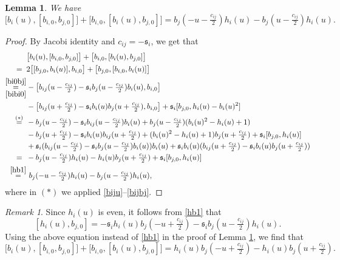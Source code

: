 \documentclass[11pt,reqno]{amsart}
\numberwithin{equation}{section}
\newtheorem{lem}[thm]{Lemma}
\theoremstyle{definition}
\theoremstyle{remark}
\newtheorem{rem}[thm]{Remark}
\newcommand{\beq}{\begin{equation}}
\newcommand{\eeq}{\end{equation}}
\newcommand{\ka}{{\mathfrak s}}
\begin{document}
\begin{lem}\label{serre0u0}
We have 
\begin{equation}\label{serre0u}
\big[ b_i(u),[ b_{i,0}, b_{j,0}]\big]+\big[ b_{i,0},[ b_{i}(u), b_{j,0}]\big]= b_j(-u-\tfrac{c_{ij}}{2}) h_i(u)-  b_j(u-\tfrac{c_{ij}}{2}) h_i(u).
\end{equation}
\end{lem}
\begin{proof} 
By Jacobi identity and $c_{ij}=-\ka_i$, we get that
\begin{align*}
&\big[ b_{i}(u),[ b_{i,0}, b_{j,0}]\big]+\big[ b_{i,0},[ b_{i}(u), b_{j,0}]\big]\\
=\hskip0.19cm &2\big[[ b_{j,0}, b_{i}(u)], b_{i,0}\big]+\big[ b_{j,0},[ b_{i,0}, b_i(u)]\big]\\
\overset{\eqref{bi0bj}}{\underset{\eqref{bibi0}}{=}} &-\big[ b_{ij}(u-\tfrac{c_{ij}}{2})-\ka_ib_j(u-\tfrac{c_{ij}}{2}) b_i(u), b_{i,0}\big]\\&-\big[ b_{ij}(u+\tfrac{c_{ij}}{2})-\ka_i b_i(u) b_j(u+\tfrac{c_{ij}}{2}), b_{i,0}\big]+\ka_i[ b_{j,0}, h_i(u)- b_i(u)^2]\\
\stackrel{(*)}{=}\hskip0.15cm &- b_j(u-\tfrac{c_{ij}}{2})- \ka_ib_{ij}(u-\tfrac{c_{ij}}{2}) b_i(u)+ b_j(u-\tfrac{c_{ij}}{2})( b_i(u)^2- h_i(u)+1)\\& - b_j(u+\tfrac{c_{ij}}{2})- \ka_ib_i(u) b_{ij}(u+\tfrac{c_{ij}}{2})+ ( b_i(u)^2- h_i(u)+1) b_j(u+\tfrac{c_{ij}}{2})+\ka_i[ b_{j,0}, h_i(u)]\\&+\ka_i( b_{ij}(u-\tfrac{c_{ij}}{2})-\ka_i b_j(u-\tfrac{c_{ij}}{2}) b_i(u)) b_i(u)+ \ka_ib_i(u)( b_{ij}(u+\tfrac{c_{ij}}{2})-\ka_i b_i(u) b_j(u+\tfrac{c_{ij}}{2}))\\
=\hskip0.19cm &- b_j(u-\tfrac{c_{ij}}{2}) h_i(u)-  h_i(u) b_j(u+\tfrac{c_{ij}}{2})+\ka_i[ b_{j,0}, h_i(u)]\\
\stackrel{\eqref{hb1}}{=}&~ b_j(-u-\tfrac{c_{ij}}{2}) h_i(u)-  b_j(u-\tfrac{c_{ij}}{2}) h_i(u),
\end{align*}
where in $(*)$ we applied \eqref{biju}--\eqref{bijbj}.
\end{proof}

\begin{rem}
Since $ h_i(u)$ is even, it follows from \eqref{hb1} that
\[
[ h_i(u), b_{j,0}]=- \ka_ih_i(u) b_j(-u+\tfrac{c_{ij}}2)- \ka_ib_j(u-\tfrac{c_{ij}}2) h_i(u).
\]
Using the above equation instead of \eqref{hb1} in the proof of Lemma \ref{serre0u0}, we find that
\beq\label{serre0u-new}
\big[ b_i(u),[ b_{i,0}, b_{j,0}]\big]+\big[ b_{i,0},[ b_{i}(u), b_{j,0}]\big]= h_i(u) b_j(-u+\tfrac{c_{ij}}2)-h_i(u) b_j(u+\tfrac{c_{ij}}2).
\eeq
\end{rem}
\end{document}
